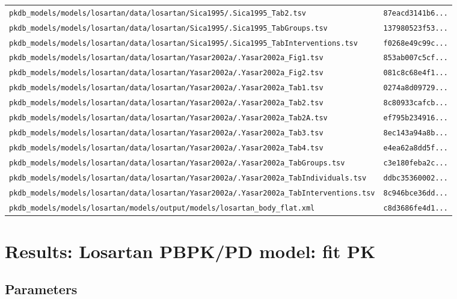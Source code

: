 \documentclass{article}
\begin{document}
\begin{longtable}{ll}
\texttt{pkdb\_models/models/losartan/data/losartan/Sica1995/.Sica1995\_Tab2.tsv} & \texttt{87eacd3141b6...} \\
\texttt{pkdb\_models/models/losartan/data/losartan/Sica1995/.Sica1995\_TabGroups.tsv} & \texttt{137980523f53...} \\
\texttt{pkdb\_models/models/losartan/data/losartan/Sica1995/.Sica1995\_TabInterventions.tsv} & \texttt{f0268e49c99c...} \\
\texttt{pkdb\_models/models/losartan/data/losartan/Yasar2002a/.Yasar2002a\_Fig1.tsv} & \texttt{853ab007c5cf...} \\
\texttt{pkdb\_models/models/losartan/data/losartan/Yasar2002a/.Yasar2002a\_Fig2.tsv} & \texttt{081c8c68e4f1...} \\
\texttt{pkdb\_models/models/losartan/data/losartan/Yasar2002a/.Yasar2002a\_Tab1.tsv} & \texttt{0274a8d09729...} \\
\texttt{pkdb\_models/models/losartan/data/losartan/Yasar2002a/.Yasar2002a\_Tab2.tsv} & \texttt{8c80933cafcb...} \\
\texttt{pkdb\_models/models/losartan/data/losartan/Yasar2002a/.Yasar2002a\_Tab2A.tsv} & \texttt{ef795b234916...} \\
\texttt{pkdb\_models/models/losartan/data/losartan/Yasar2002a/.Yasar2002a\_Tab3.tsv} & \texttt{8ec143a94a8b...} \\
\texttt{pkdb\_models/models/losartan/data/losartan/Yasar2002a/.Yasar2002a\_Tab4.tsv} & \texttt{e4ea62a8dd5f...} \\
\texttt{pkdb\_models/models/losartan/data/losartan/Yasar2002a/.Yasar2002a\_TabGroups.tsv} & \texttt{c3e180feba2c...} \\
\texttt{pkdb\_models/models/losartan/data/losartan/Yasar2002a/.Yasar2002a\_TabIndividuals.tsv} & \texttt{ddbc35360002...} \\
\texttt{pkdb\_models/models/losartan/data/losartan/Yasar2002a/.Yasar2002a\_TabInterventions.tsv} & \texttt{8c946bce36dd...} \\
\texttt{pkdb\_models/models/losartan/models/output/models/losartan\_body\_flat.xml} & \texttt{c8d3686fe4d1...} \\
\end{longtable}

\section{Results: Losartan PBPK/PD model: fit PK}

\subsection{Parameters}
\end{document}
